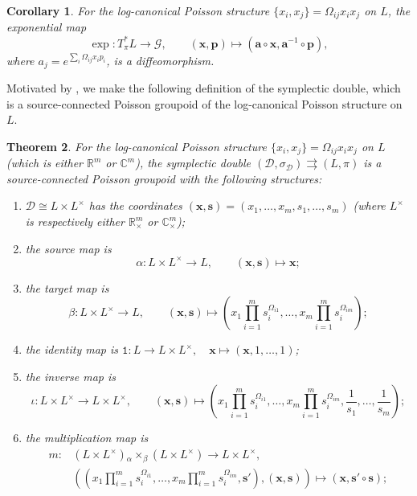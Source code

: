 \documentclass{amsart}
\newtheorem{theorem}{Theorem}[section]
\newtheorem{corollary}[theorem]{Corollary}
\numberwithin{equation}{section}
\newcommand{\bfa}{{\boldsymbol{a}}}
\newcommand{\bfp}{{\boldsymbol{p}}}
\newcommand{\bfs}{{\boldsymbol{s}}}
\newcommand{\bfx}{{\boldsymbol{x}}}
\newcommand{\cD}{\mathcal{D}}
\newcommand{\cG}{\mathcal{G}}
\newcommand{\CC}{\mathbb{C}}
\newcommand{\RR}{\mathbb{R}}
\newcommand{\rra}{\rightrightarrows}
\begin{document}
\begin{corollary} \label{cor:exp}
  For the log-canonical Poisson structure $\{x_i, x_j\} = \Omega_{ij} x_i x_j$ on $L$, the exponential map
  \[\exp: T^*_\pi L \to \cG, \qquad (\bfx, \bfp) \mapsto \left(\bfa \circ \bfx, \bfa^{-1} \circ \bfp\right),\]
  where $a_j = e^{\sum_i \Omega_{ij} x_ip_i}$, is a diffeomorphism.
\end{corollary}

Motivated by \cite{FG09c}, we make the following definition of the symplectic double, which is a source-connected Poisson groupoid of the log-canonical Poisson structure on $L$.
\begin{theorem} \label{thm:SymDBLoc}
  \cite{FG09c}
  For the log-canonical Poisson structure $\{x_i, x_j\} = \Omega_{ij} x_i x_j$ on $L$ (which is either $\RR^m$ or $\CC^m$), the \emph{symplectic double} $(\cD, \sigma_\cD) \rra (L, \pi)$ is a source-connected Poisson groupoid with the following structures:
  \begin{enumerate}
    \item $\cD \cong L \times L^\times$ has the coordinates $(\bfx, \bfs) = (x_1, \ldots, x_m, s_1, \ldots, s_m)$ (where $L^\times$ is respectively either $\RR_\times^m$ or $\CC_\times^m$);
    \item the source map is
      \[\alpha: L \times L^\times \to L, \qquad (\bfx, \bfs) \mapsto \bfx;\]
    \item the target map is
      \[\beta: L \times L^\times \to L, \qquad (\bfx, \bfs) \mapsto \left(x_1 \prod_{i=1}^m s_i^{\Omega_{i1}}, \ldots, x_m \prod_{i=1}^m s_i^{\Omega_{im}}\right);\]
    \item the identity map is $\mathtt{1}: L \to L \times L^\times, \quad \bfx \mapsto (\bfx, 1, \ldots, 1)$;
    \item the inverse map is
      \[\iota: L \times L^\times \to L \times L^\times, \qquad (\bfx,\bfs) \mapsto \left(x_1\prod_{i=1}^m s_i^{\Omega_{i1}}, \ldots, x_m\prod_{i=1}^m s_i^{\Omega_{im}}, \frac{1}{s_1}, \ldots, \frac{1}{s_m}\right);\]
    \item the multiplication map is
      \[\begin{aligned}
	  m: & \left(L \times L^\times\right) {_\alpha \times_\beta} \left(L \times L^\times\right) \to L \times L^\times, \\
	     & \left(\left(x_1 \prod_{i=1}^m s_i^{\Omega_{i1}}, \ldots, x_m \prod_{i=1}^m s_i^{\Omega_{im}}, \bfs'\right), (\bfx, \bfs)\right) \mapsto (\bfx, \bfs' \circ \bfs);
        \end{aligned}\]

\end{enumerate}
\end{theorem}
\end{document}
